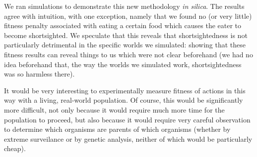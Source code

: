 \documentclass{article}
\begin{document}
We ran simulations to demonstrate this new methodology \emph{in silica}.
The results agree with intuition, with one exception, namely that we found
no (or very little)
fitness penalty associated with eating a certain food which causes the
eater to become shortsighted. We speculate that this reveals that shortsightedness
is not particularly detrimental in the specific worlds we simulated:
showing that these fitness results can reveal things to us which were
not clear beforehand (we had no idea beforehand that, the way the worlds
we simulated work, shortsightedness was so harmless there).

It would be very interesting to experimentally measure fitness of actions
in this way with a living, real-world population. Of course, this would be
significantly more difficult, not only because it would require much more time
for the population to proceed, but also because it would require very careful
observation to determine which organisms are parents of which organisms
(whether by extreme surveilance or by genetic analysis, neither of which
would be particularly cheap).






\end{document}
